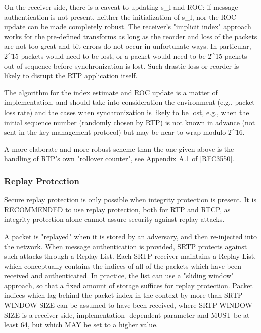 \documentclass{article}
\begin{document}
On the receiver side, there is a caveat to updating s\_l and ROC: if message authentication is not present, neither the initialization of s\_l, nor the ROC update can be made completely robust.  The receiver's "implicit index" approach works for the pre-defined transforms as long as the reorder and loss of the packets are not too great and bit-errors do not occur in unfortunate ways.  In particular, 2\textasciicircum{}15 packets would need to be lost, or a packet would need to be 2\textasciicircum{}15 packets out of sequence before synchronization is lost.  Such drastic loss or reorder is likely to disrupt the RTP application itself.

The algorithm for the index estimate and ROC update is a matter of implementation, and should take into consideration the environment (e.g., packet loss rate) and the cases when synchronization is likely to be lost, e.g., when the initial sequence number (randomly chosen by RTP) is not known in advance (not sent in the key management protocol) but may be near to wrap modulo 2\textasciicircum{}16.

A more elaborate and more robust scheme than the one given above is the handling of RTP's own "rollover counter", see Appendix A.1 of [RFC3550].

\subsubsection{Replay Protection}

Secure replay protection is only possible when integrity protection is present.  It is RECOMMENDED to use replay protection, both for RTP and RTCP, as integrity protection alone cannot assure security against replay attacks.

A packet is "replayed" when it is stored by an adversary, and then re-injected into the network.  When message authentication is provided, SRTP protects against such attacks through a Replay List. Each SRTP receiver maintains a Replay List, which conceptually contains the indices of all of the packets which have been received and authenticated.  In practice, the list can use a "sliding window" approach, so that a fixed amount of storage suffices for replay protection.  Packet indices which lag behind the packet index in the context by more than SRTP-WINDOW-SIZE can be assumed to have been received, where SRTP-WINDOW-SIZE is a receiver-side, implementation- dependent parameter and MUST be at least 64, but which MAY be set to a higher value.
\end{document}
